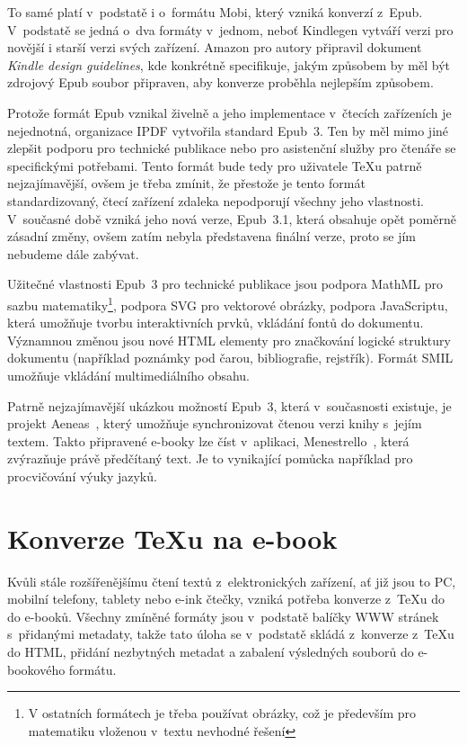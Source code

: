 \documentclass{csbulletin}
\begin{document}
To samé platí v~podstatě i o~formátu Mobi, který vzniká konverzí z~Epub.
V~podstatě se jedná o~dva formáty v~jednom, neboť Kindlegen vytváří verzi pro
novější i starší verzi svých zařízení. Amazon pro autory připravil dokument
\textit{Kindle design guidelines}, kde konkrétně specifikuje, jakým způsobem by
měl být zdrojový Epub soubor připraven, aby konverze proběhla nejlepším
způsobem.

Protože formát Epub vznikal živelně a jeho implementace v~čtecích zařízeních je
nejednotná, organizace IPDF \cite{bib:ipdf} vytvořila standard Epub~3. Ten by
měl mimo jiné zlepšit podporu pro technické publikace nebo pro asistenční
služby pro čtenáře se specifickými
potřebami. Tento formát bude tedy pro uživatele \TeX u patrně nejzajímavější,
ovšem je třeba zmínit, že přestože je tento formát standardizovaný, čtecí
zařízení zdaleka nepodporují všechny jeho vlastnosti. V~současné době vzniká
jeho nová verze, Epub~3.1, která obsahuje opět poměrně zásadní změny, ovšem
zatím nebyla představena finální verze, proto se jím nebudeme dále zabývat.

Užitečné vlastnosti Epub~3 pro technické publikace jsou podpora MathML
pro sazbu matematiky\footnote{V ostatních formátech je třeba používat obrázky,
což je především pro matematiku vloženou v~textu nevhodné řešení}, podpora SVG
pro vektorové obrázky, podpora JavaScriptu, která umožňuje tvorbu
interaktivních prvků, vkládání fontů do dokumentu.
Významnou změnou jsou  nové HTML elementy pro značkování logické struktury
dokumentu (například poznámky pod čarou, bibliografie, rejstřík). Formát SMIL
umožňuje vkládání multimediálního obsahu.

Patrně nejzajímavější ukázkou možností Epub~3, která v~současnosti existuje, je
projekt Aeneas~\cite{bib:aeneas}, který umožňuje
synchronizovat čtenou verzi knihy s~jejím textem. Takto připravené e-booky
lze číst v~aplikaci,
Menestrello~\cite{bib:menestrello}, která
zvýrazňuje právě předčítaný text. Je to vynikající pomůcka například pro
procvičování výuky jazyků.



\section{Konverze \TeX u na e-book}

Kvůli stále rozšířenějšímu čtení textů z~elektronických zařízení, ať již jsou
to PC, mobilní telefony, tablety nebo e-ink čtečky, vzniká potřeba konverze
z~\TeX u do do e-booků.  Všechny zmíněné formáty jsou v~podstatě balíčky WWW
stránek s~přidanými metadaty, takže tato úloha se v~podstatě skládá z~konverze
z~\TeX u do HTML, přidání nezbytných metadat a zabalení výsledných souborů do
e-bookového formátu.
\end{document}
